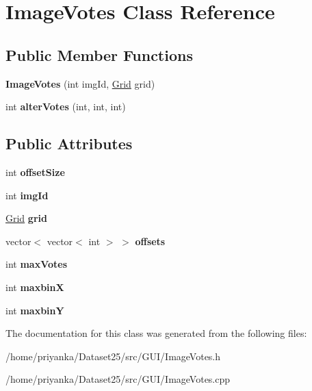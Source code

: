 \hypertarget{classImageVotes}{\section{\-Image\-Votes \-Class \-Reference}
\label{classImageVotes}
}
\subsection*{\-Public \-Member \-Functions}
\begin{DoxyCompactItemize}
\item 
\hypertarget{classImageVotes_ad4607ac8f62f3fcf496b4a121a00ee4a}{{\bfseries \-Image\-Votes} (int img\-Id, \hyperlink{classGrid}{\-Grid} grid)}\label{classImageVotes_ad4607ac8f62f3fcf496b4a121a00ee4a}

\item 
\hypertarget{classImageVotes_aca051dafc2593acf206982ccba89f29e}{int {\bfseries alter\-Votes} (int, int, int)}\label{classImageVotes_aca051dafc2593acf206982ccba89f29e}

\end{DoxyCompactItemize}
\subsection*{\-Public \-Attributes}
\begin{DoxyCompactItemize}
\item 
\hypertarget{classImageVotes_ab091b6fc057a340e0dec1ec8ecdc2068}{int {\bfseries offset\-Size}}\label{classImageVotes_ab091b6fc057a340e0dec1ec8ecdc2068}

\item 
\hypertarget{classImageVotes_ae5270d0d4b6f9ae069b3cb926bd29c0e}{int {\bfseries img\-Id}}\label{classImageVotes_ae5270d0d4b6f9ae069b3cb926bd29c0e}

\item 
\hypertarget{classImageVotes_a244e45706478d62a53b13db049b47b52}{\hyperlink{classGrid}{\-Grid} {\bfseries grid}}\label{classImageVotes_a244e45706478d62a53b13db049b47b52}

\item 
\hypertarget{classImageVotes_a6db69485a42c5fae731e4800b08a5b26}{vector$<$ vector$<$ int $>$ $>$ {\bfseries offsets}}\label{classImageVotes_a6db69485a42c5fae731e4800b08a5b26}

\item 
\hypertarget{classImageVotes_a63af62d90937f1f65c6c6bf6ea071c5f}{int {\bfseries max\-Votes}}\label{classImageVotes_a63af62d90937f1f65c6c6bf6ea071c5f}

\item 
\hypertarget{classImageVotes_abf09b33968b11ab551f472ad16eab411}{int {\bfseries maxbin\-X}}\label{classImageVotes_abf09b33968b11ab551f472ad16eab411}

\item 
\hypertarget{classImageVotes_aa7286de7d363910a712f1ff6312709c0}{int {\bfseries maxbin\-Y}}\label{classImageVotes_aa7286de7d363910a712f1ff6312709c0}

\end{DoxyCompactItemize}


\-The documentation for this class was generated from the following files\-:\begin{DoxyCompactItemize}
\item 
/home/priyanka/\-Dataset25/src/\-G\-U\-I/\-Image\-Votes.\-h\item 
/home/priyanka/\-Dataset25/src/\-G\-U\-I/\-Image\-Votes.\-cpp\end{DoxyCompactItemize}
